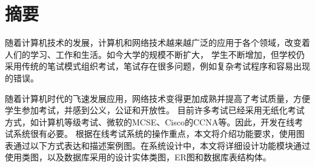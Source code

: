\chapter{摘要}

随着计算机技术的发展，计算机和网络技术越来越广泛的应用于各个领域，改变着人们的学习、工作和生活。如今大学的规模不断扩大，
学生不断增加，但学校仍采用传统的笔试模式组织考试，笔试存在很多问题，例如复杂考试程序和容易出现的错误。
\par
随着计算机时代的飞速发展应用，网络技术变得更加成熟并提高了考试质量，方便学生参加考试，并感到公义，公证和开放性。
目前许多考试已经采用无纸化考试方式，如计算机等级考试、微软的MCSE、Cisco的CCNA等。因此，开发在线考试系统很有必要。
根据在线考试系统的操作重点，本文将介绍功能要求，使用图表通过以下方式表达和描述案例图。在系统设计中，本文将详细设计功能模块通过使用类图，以及数据库采用的设计实体类图，ER图和数据库表结构体。
